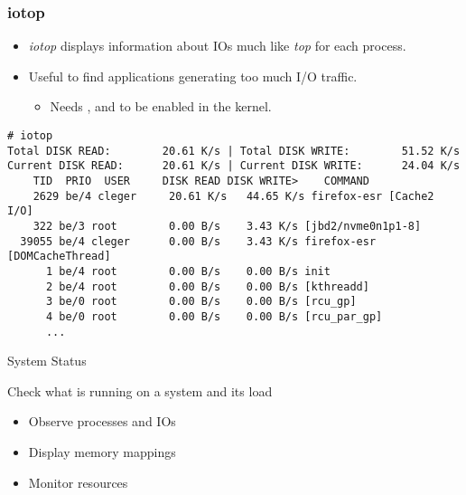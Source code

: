 \begin{frame}[fragile]
  \frametitle{iotop}
  \begin{itemize}
    \item {\em iotop} displays information about IOs much like {\em top} for each
          process.
    \item Useful to find applications generating too much I/O traffic.
    \begin{itemize}
    \item Needs ,
           and
           to be enabled in the kernel.
    \end{itemize}
  \end{itemize}
  \begin{block}{}
    \begin{verbatim}
# iotop
Total DISK READ:        20.61 K/s | Total DISK WRITE:        51.52 K/s
Current DISK READ:      20.61 K/s | Current DISK WRITE:      24.04 K/s
    TID  PRIO  USER     DISK READ DISK WRITE>    COMMAND                                                                                                                                                                                                                        
    2629 be/4 cleger     20.61 K/s   44.65 K/s firefox-esr [Cache2 I/O]
    322 be/3 root        0.00 B/s    3.43 K/s [jbd2/nvme0n1p1-8]
  39055 be/4 cleger      0.00 B/s    3.43 K/s firefox-esr [DOMCacheThread]
      1 be/4 root        0.00 B/s    0.00 B/s init
      2 be/4 root        0.00 B/s    0.00 B/s [kthreadd]
      3 be/0 root        0.00 B/s    0.00 B/s [rcu_gp]
      4 be/0 root        0.00 B/s    0.00 B/s [rcu_par_gp]
      ...
    \end{verbatim}
  \end{block}
\end{frame}

\setuplabframe
{System Status}
{
  Check what is running on a system and its load
  \begin{itemize}
    \item Observe processes and IOs
    \item Display memory mappings
    \item Monitor resources
  \end{itemize}
}
